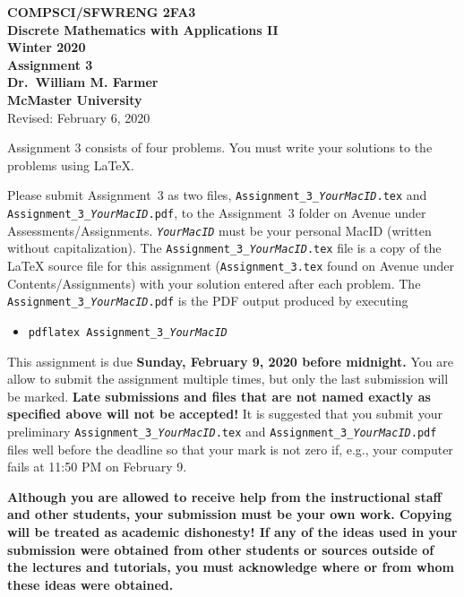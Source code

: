 \documentclass[11pt,fleqn]{article}
\begin{document}
\begin{center}

  {\large \textbf{COMPSCI/SFWRENG 2FA3}}\\[2mm]
  {\large \textbf{Discrete Mathematics with Applications II}}\\[2mm]
  {\large \textbf{Winter 2020}}\\[8mm]
  {\huge \textbf{Assignment 3}}\\[6mm]
  {\large \textbf{Dr.~William M. Farmer}}\\[2mm]
  {\large \textbf{McMaster University}}\\[6mm]
  {\large Revised: February 6, 2020}

\end{center}

\medskip

Assignment 3 consists of four problems.  You must write your solutions
to the problems using LaTeX.

Please submit Assignment~3 as two files,
\texttt{Assignment\_3\_\emph{YourMacID}.tex} and
\texttt{Assignment\_3\_\emph{YourMacID}.pdf}, to the Assignment~3
folder on Avenue under Assessments/Assignments.
\texttt{\emph{YourMacID}} must be your personal MacID (written without
capitalization).  The \texttt{Assignment\_3\_\emph{YourMacID}.tex}
file is a copy of the LaTeX source file for this assignment
(\texttt{Assignment\_3.tex} found on Avenue under
Contents/Assignments) with your solution entered after each problem.
The \texttt{Assignment\_3\_\emph{YourMacID}.pdf} is the PDF output
produced by executing

\begin{itemize}

  \item[] \texttt{pdflatex Assignment\_3\_\emph{YourMacID}}

\end{itemize}

This assignment is due \textbf{Sunday, February 9, 2020 before
  midnight.}  You are allow to submit the assignment multiple times,
but only the last submission will be marked.  \textbf{Late submissions
  and files that are not named exactly as specified above will not be
  accepted!}  It is suggested that you submit your preliminary
\texttt{Assignment\_3\_\emph{YourMacID}.tex} and
\texttt{Assignment\_3\_\emph{YourMacID}.pdf} files well before the
deadline so that your mark is not zero if, e.g., your computer fails
at 11:50 PM on February 9.

\textbf{Although you are allowed to receive help from the
  instructional staff and other students, your submission must be your
  own work.  Copying will be treated as academic dishonesty! If any of
  the ideas used in your submission were obtained from other students
  or sources outside of the lectures and tutorials, you must
  acknowledge where or from whom these ideas were obtained.}
\end{document}
